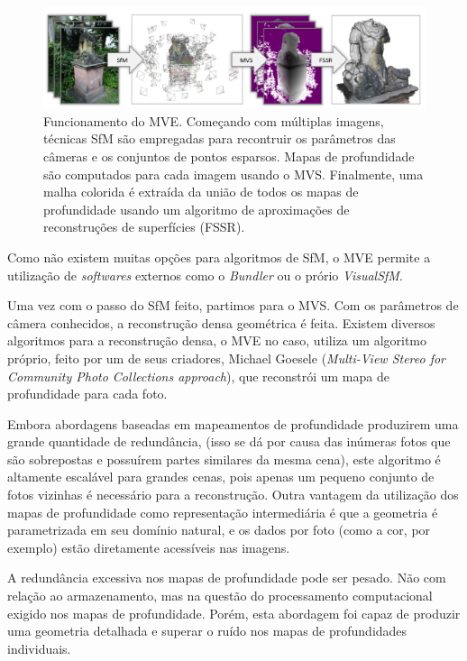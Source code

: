 \begin{figure}[!h]
	\centering
	\includegraphics[width=1\linewidth]{figs/mvepipe.png}
	\caption{%
	Funcionamento do MVE. Começando com múltiplas imagens, técnicas SfM são empregadas para recontruir os parâmetros das câmeras e os conjuntos de pontos esparsos. Mapas de profundidade são computados para cada imagem usando o MVS. Finalmente, uma malha colorida é extraída da união de todos os mapas de profundidade usando um algoritmo de aproximações de reconstruções de superfícies (FSSR).%
	}\label{fig:mvepipeline}
\end{figure}


Como não existem muitas opções para algoritmos de SfM, o MVE permite a utilização de {\it softwares} externos como o {\it Bundler} ou o prório {\it VisualSfM}.

Uma vez com o passo do SfM feito, partimos para o MVS. Com os parâmetros de câmera conhecidos, a reconstrução densa geométrica é feita. Existem diversos algoritmos para a reconstrução densa, o MVE no caso, utiliza um algoritmo próprio, feito por um de seus criadores, Michael Goesele ({\it Multi-View Stereo for Community Photo Collections approach}), que reconstrói um mapa de profundidade para cada foto. 

Embora abordagens baseadas em mapeamentos de profundidade produzirem uma grande quantidade de redundância, (isso se dá por causa das inúmeras fotos que são sobrepostas e possuírem partes similares da mesma cena), este algoritmo é altamente escalável para grandes cenas, pois apenas um pequeno conjunto de fotos vizinhas é necessário para a reconstrução. Outra vantagem da utilização dos mapas de profundidade como representação intermediária é que a geometria é parametrizada em seu domínio natural, e os dados por foto (como a cor, por exemplo) estão diretamente acessíveis nas imagens.

A redundância excessiva nos mapas de profundidade pode ser pesado. Não com relação ao armazenamento, mas na questão do processamento computacional exigido nos mapas de profundidade. Porém, esta abordagem foi capaz de produzir uma geometria detalhada e superar o ruído nos mapas de profundidades individuais.

